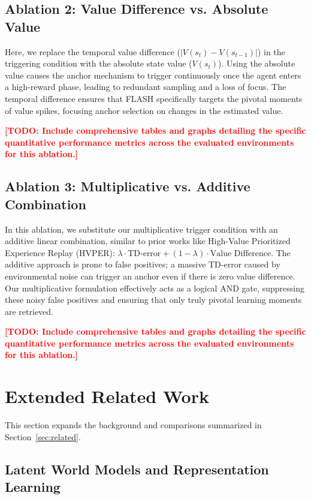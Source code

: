 \documentclass{article} %
\newcommand{\todo}[1]{\textcolor{red}{\textbf{[TODO: #1]}}}
\begin{document}
\subsection{Ablation 2: Value Difference vs. Absolute Value}
Here, we replace the temporal value difference ($|V(s_t) - V(s_{t-1})|$) in the triggering condition with the absolute state value ($V(s_t)$). Using the absolute value causes the anchor mechanism to trigger continuously once the agent enters a high-reward phase, leading to redundant sampling and a loss of focus. The temporal difference ensures that FLASH specifically targets the pivotal moments of value spikes, focusing anchor selection on changes in the estimated value.

\todo{Include comprehensive tables and graphs detailing the specific quantitative performance metrics across the evaluated environments for this ablation.}

\subsection{Ablation 3: Multiplicative vs. Additive Combination}
In this ablation, we substitute our multiplicative trigger condition with an additive linear combination, similar to prior works like High-Value Prioritized Experience Replay (HVPER): $\lambda \cdot \text{TD-error} + (1-\lambda) \cdot \text{Value Difference}$. The additive approach is prone to false positives; a massive TD-error caused by environmental noise can trigger an anchor even if there is zero value difference. Our multiplicative formulation effectively acts as a logical AND gate, suppressing these noisy false positives and ensuring that only truly pivotal learning moments are retrieved.

\todo{Include comprehensive tables and graphs detailing the specific quantitative performance metrics across the evaluated environments for this ablation.}

\section{Extended Related Work}
\label{sec:appendix_related_work}
This section expands the background and comparisons summarized in Section~\ref{sec:related}.

\subsection{Latent World Models and Representation Learning}
\end{document}
